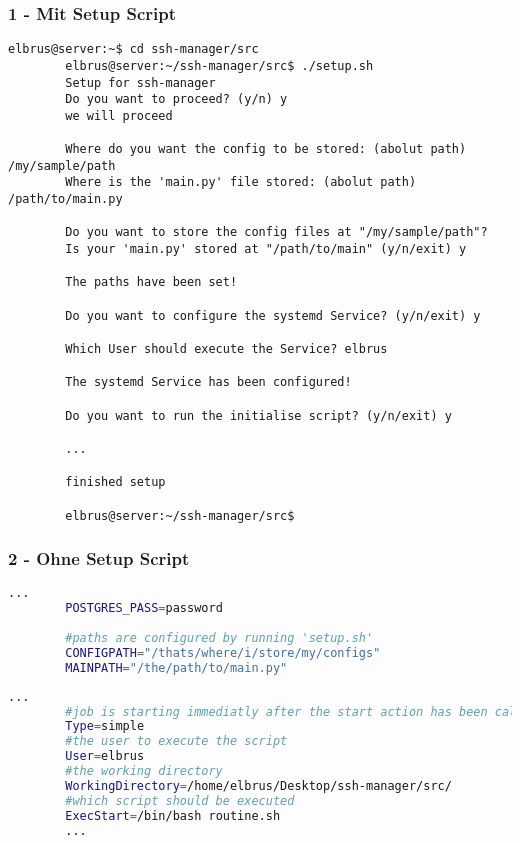 \documentclass{article}
\begin{document}
	\subsubsection{1 - Mit Setup Script}
	\lstset{style=commands}
	\begin{lstlisting}[caption={Ausführen des setup Scripts}]
		elbrus@server:~$ cd ssh-manager/src
		elbrus@server:~/ssh-manager/src$ ./setup.sh
		Setup for ssh-manager
		Do you want to proceed? (y/n) y
		we will proceed
		
		Where do you want the config to be stored: (abolut path) /my/sample/path
		Where is the 'main.py' file stored: (abolut path) /path/to/main.py
		
		Do you want to store the config files at "/my/sample/path"? 
		Is your 'main.py' stored at "/path/to/main" (y/n/exit) y
		
		The paths have been set!
		
		Do you want to configure the systemd Service? (y/n/exit) y
		
		Which User should execute the Service? elbrus
		
		The systemd Service has been configured!
		
		Do you want to run the initialise script? (y/n/exit) y
		
		...
		
		finished setup
		
		elbrus@server:~/ssh-manager/src$
	\end{lstlisting}
	
	\newpage
	\subsubsection{2 - Ohne Setup Script}
	\lstset{style=files}
	\begin{lstlisting}[caption={.env - Die Variable 'CONFIGPATH' sowie die Variable 'MAINPATH' anpassen.}, language=bash, keywords={CONFIGPATH, MAINPATH}, keywordstyle=\color{red}, firstnumber=17]
		...
		POSTGRES_PASS=password
		
		#paths are configured by running 'setup.sh'
		CONFIGPATH="/thats/where/i/store/my/configs"
		MAINPATH="/the/path/to/main.py"
	\end{lstlisting}

	\begin{lstlisting}[caption={ssh-manager.service.example - Die Variable 'WorkingDirectory' sowie die Variable 'User' anpassen.},language=bash ,keywords={WorkingDirectory, User}, keywordstyle=\color{red}, firstnumber=5]
		...
		#job is starting immediatly after the start action has been called
		Type=simple
		#the user to execute the script
		User=elbrus
		#the working directory
		WorkingDirectory=/home/elbrus/Desktop/ssh-manager/src/
		#which script should be executed
		ExecStart=/bin/bash routine.sh
		...
	\end{lstlisting}
\end{document}
